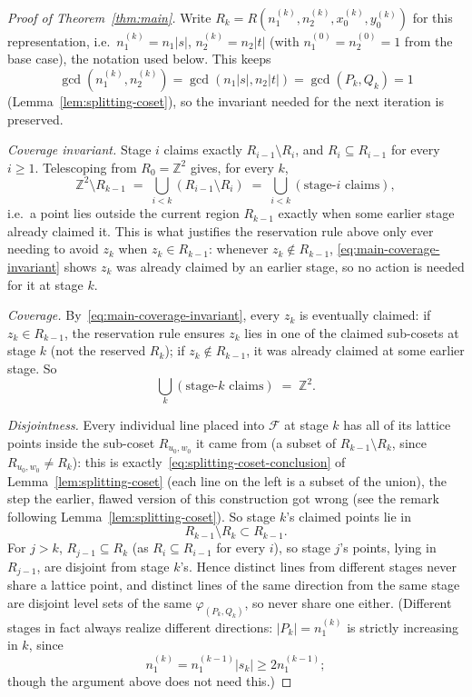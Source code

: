 \documentclass[a4paper,11pt,oneside,reqno]{amsart}
\theoremstyle{definition}
\theoremstyle{remark}
\theoremstyle{plain}
\newcommand{\Z}{\mathbb{Z}}
\begin{document}
\begin{proof}[Proof of Theorem~\ref{thm:main}]
  Write
  \(R_k=R(n_1^{(k)},n_2^{(k)},x_0^{(k)},y_0^{(k)})\) for this representation, i.e.\
  \(n_1^{(k)}=n_1|s|\), \(n_2^{(k)}=n_2|t|\) (with \(n_1^{(0)}=n_2^{(0)}=1\) from the base case), the
  notation used below. This keeps
  \[
    \gcd(n_1^{(k)},n_2^{(k)}) = \gcd(n_1|s|,n_2|t|) = \gcd(P_k,Q_k) = 1
  \]
  (Lemma~\ref{lem:splitting-coset}), so the invariant needed for the next iteration is preserved.

  \emph{Coverage invariant.} Stage \(i\) claims exactly \(R_{i-1}\setminus R_i\), and \(R_i\subseteq
  R_{i-1}\) for every \(i\ge1\). Telescoping from \(R_0=\Z^2\) gives, for every \(k\),
  \begin{equation}
    \label{eq:main-coverage-invariant}
    \Z^2\setminus R_{k-1} \;=\; \bigcup_{i<k}(R_{i-1}\setminus R_i) \;=\; \bigcup_{i<k}
    (\text{stage-}i\text{ claims}),
  \end{equation}
  i.e.\ a point lies outside the current region \(R_{k-1}\) exactly when some earlier stage already
  claimed it. This is what justifies the reservation rule above only ever needing to avoid \(z_k\)
  when \(z_k\in R_{k-1}\): whenever \(z_k\notin R_{k-1}\), \eqref{eq:main-coverage-invariant} shows
  \(z_k\) was already claimed by an earlier stage, so no action is needed for it at stage \(k\).

  \emph{Coverage.} By~\eqref{eq:main-coverage-invariant}, every \(z_k\) is eventually claimed: if
  \(z_k\in R_{k-1}\), the reservation rule ensures \(z_k\) lies in one of the claimed sub-cosets at
  stage \(k\) (not the reserved \(R_k\)); if \(z_k\notin R_{k-1}\), it was already claimed at some
  earlier stage. So
  \begin{equation}
    \label{eq:main-coverage}
    \bigcup_k(\text{stage-}k\text{ claims}) \;=\; \Z^2.
  \end{equation}

  \emph{Disjointness.} Every individual line placed into \(\mathcal F\) at stage \(k\) has all of its
  lattice points inside the sub-coset \(R_{u_0,w_0}\) it came from (a subset of \(R_{k-1}\setminus
  R_k\), since \(R_{u_0,w_0}\ne R_k\)): this is exactly~\eqref{eq:splitting-coset-conclusion} of
  Lemma~\ref{lem:splitting-coset} (each line on the left is a subset of the union), the step the
  earlier, flawed version of this construction got wrong (see the remark following
  Lemma~\ref{lem:splitting-coset}). So stage \(k\)'s claimed points lie in
  \[R_{k-1}\setminus  R_k\subset R_{k-1}.\]
  For \(j>k\), \(R_{j-1}\subseteq R_k\) (as \(R_i\subseteq R_{i-1}\) for every \(i\)),
  so stage \(j\)'s points, lying in \(R_{j-1}\), are disjoint from stage \(k\)'s. Hence distinct lines
  from different stages never share a lattice point, and distinct lines of the same direction from
  the same stage are disjoint level sets of the same \(\varphi_{(P_k,Q_k)}\), so never share one
  either.
  (Different stages in fact always realize different directions: \(|P_k|=n_1^{(k)}\) is
  strictly increasing in \(k\), since
  \[n_1^{(k)}=n_1^{(k-1)}|s_k|\ge2n_1^{(k-1)};\]
  though the  argument above does not need this.)


\end{proof}
\end{document}

